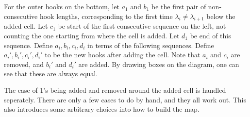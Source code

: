 \documentclass{amsart}
\theoremstyle{definition}
\begin{document}
For the outer hooks on the bottom, let $a_1$ and $b_1$ be the first
pair of non-consecutive hook lengths, corresponding to the first time
$\lambda_i \neq \lambda_{i+1}$ below the added cell.  Let $c_1$ be
start of the first consecutive sequence on the left, not counting the
one starting from where the cell is added.  Let $d_1$ be end of this
sequence.  Define $a_i, b_i, c_i, d_i$ in terms of the following
sequences.  Define $a_i', b_i', c_i', d_i'$ to be the new hooks after
adding the cell.  Note that $a_i$ and $c_i$ are removed, and $b_i'$
and $d_i'$ are added.  By drawing boxes on the diagram, one can see
that these are always equal.

The case of 1's being added and removed around the added cell is
handled seperately.  There are only a few cases to do by hand, and
they all work out.  This also introduces some arbitrary choices into
how to build the map.
\end{document}
